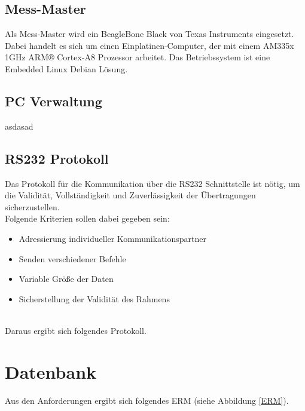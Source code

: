 \subsection{Mess-Master}
\label{section_Mess-Master}

Als Mess-Master wird ein BeagleBone Black von Texas Instruments eingesetzt. Dabei handelt es sich um einen Einplatinen-Computer, der mit einem AM335x 1GHz ARM® Cortex-A8 Prozessor arbeitet. Das Betriebssystem ist eine Embedded Linux Debian Lösung.


\subsection{PC Verwaltung}
\label{section_Verwaltung}
asdasad


\subsection{RS232 Protokoll}
\label{section_RS232_Protokoll}
Das Protokoll für die Kommunikation über die RS232 Schnittstelle ist nötig, um die Validität, Vollständigkeit und Zuverlässigkeit der Übertragungen sicherzustellen.\ \\

Folgende Kriterien sollen dabei gegeben sein:
\begin{itemize}
\item Adressierung individueller Kommunikationspartner
\item Senden verschiedener Befehle
\item Variable Größe der Daten
\item Sicherstellung der Validität des Rahmens
\end{itemize}
\ \\
Daraus ergibt sich folgendes Protokoll.

\section{Datenbank}
\label{section_EntwurfDatenbank}

Aus den Anforderungen ergibt sich folgendes \ac{ERM} (siehe Abbildung \ref{ERM}). \\

